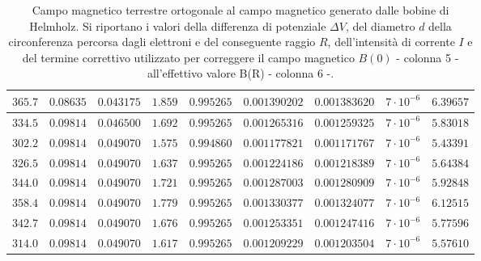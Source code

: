 \documentclass[]{article}
\begin{document}
\begin{table}[H]
\begin{tabular}{||c|c|c|c|c|c|c|c|c||}
        $365.7$ & $0.08635$ & $0.043175$ & $1.859$ & $0.995265$ & $0.001390202$ & $0.001383620$ & $7 \cdot 10^{-6}$ & $6.39657$ \\\hline
        $334.5$ & $0.09814$ & $0.046500$ & $1.692$ & $0.995265$ & $0.001265316$ & $0.001259325$ & $7 \cdot 10^{-6}$ & $5.83018$ \\\hline
        $302.2$ & $0.09814$ & $0.049070$ & $1.575$ & $0.994860$ & $0.001177821$ & $0.001171767$ & $7 \cdot 10^{-6}$ & $5.43391$ \\\hline
        $326.5$ & $0.09814$ & $0.049070$ & $1.637$ & $0.995265$ & $0.001224186$ & $0.001218389$ & $7 \cdot 10^{-6}$ & $5.64384$ \\\hline
        $344.0$ & $0.09814$ & $0.049070$ & $1.721$ & $0.995265$ & $0.001287003$ & $0.001280909$ & $7 \cdot 10^{-6}$ & $5.92848$ \\\hline
        $358.4$ & $0.09814$ & $0.049070$ & $1.779$ & $0.995265$ & $0.001330377$ & $0.001324077$ & $7 \cdot 10^{-6}$ & $6.12515$ \\\hline
        $342.7$ & $0.09814$ & $0.049070$ & $1.676$ & $0.995265$ & $0.001253351$ & $0.001247416$ & $7 \cdot 10^{-6}$ & $5.77596$ \\\hline
        $314.0$ & $0.09814$ & $0.049070$ & $1.617$ & $0.995265$ & $0.001209229$ & $0.001203504$ & $7 \cdot 10^{-6}$ & $5.57610$ \\\hline
    
    \end{tabular}
    \caption{Campo magnetico terrestre ortogonale al campo magnetico generato dalle bobine di Helmholz. Si riportano i valori della differenza di potenziale $\Delta V$, del diametro $ d $ della circonferenza percorsa dagli elettroni e del conseguente raggio $ R $, dell'intensità di corrente $ I $ e del termine correttivo utilizzato per correggere il campo magnetico $B(0)$ - colonna 5 - all'effettivo valore B(R) - colonna 6 -.}
    \label{CM_ortogonale}
\end{table}
\end{document}
